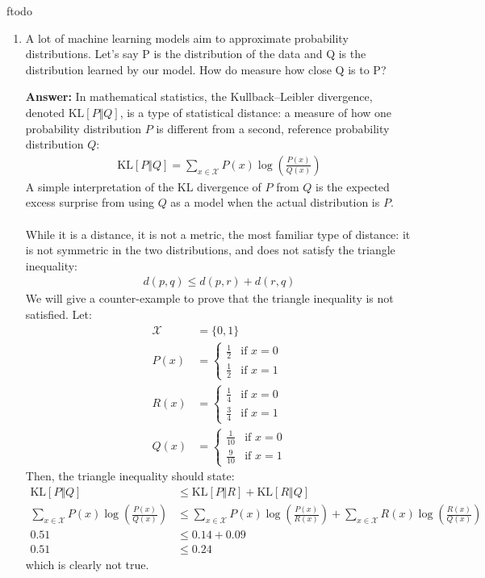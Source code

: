 ƒtodo\documentclass{article}
\newenvironment{QandA}{\begin{enumerate}[label=\arabic*.]}{\end{enumerate}}
\newenvironment{answer}{\par\normalfont \textbf{Answer:}}{}
\newcommand{\KL}[2]{\text{KL}\left[#1 \Vert #2 \right]}
\begin{document}
\begin{QandA}
    \item A lot of machine learning models aim to approximate probability distributions. Let’s say P is the distribution of the data and Q is the distribution learned by our model. How do measure how close Q is to P?
    \begin{answer}
        In mathematical statistics, the Kullback–Leibler divergence, denoted $\KL{P}{Q}$, is a type of statistical distance: a measure of how one probability distribution $P$ is different from a second, reference probability distribution $Q$:
        \begin{align*}
            \KL{P}{Q} = \sum_{x \in \mathcal{X}} P(x) \log \left( \frac{P(x)}{Q(x)} \right)
        \end{align*}
        A simple interpretation of the KL divergence of $P$ from $Q$ is the expected excess surprise from using $Q$ as a model when the actual distribution is $P$. \\\\
        While it is a distance, it is not a metric, the most familiar type of distance: it is not symmetric in the two distributions, and does not satisfy the triangle inequality:
        \begin{align*}
            d(p, q) \le d(p, r) + d(r, q)
        \end{align*}
        We will give a counter-example to prove that the triangle inequality is not satisfied. Let:
        \begin{align*}
            \mathcal{X} &= \{0, 1\} \\
            P(x) &= \begin{cases}
                \frac{1}{2} & \text{if } x = 0 \\
                \frac{1}{2} & \text{if } x = 1
            \end{cases} \\
            R(x) &= \begin{cases}
                \frac{1}{4} & \text{if } x = 0 \\
                \frac{3}{4} & \text{if } x = 1
            \end{cases} \\
            Q(x) &= \begin{cases}
                \frac{1}{10} & \text{if } x = 0 \\
                \frac{9}{10} & \text{if } x = 1
            \end{cases}        
        \end{align*}
        Then, the triangle inequality should state:
        \begin{align*}
            \KL{P}{Q} &\le \KL{P}{R} + \KL{R}{Q} \\
            \sum_{x \in \mathcal{X}} P(x) \log \left( \frac{P(x)}{Q(x)} \right) &\le \sum_{x \in \mathcal{X}} P(x) \log \left( \frac{P(x)}{R(x)} \right) + \sum_{x \in \mathcal{X}} R(x) \log \left( \frac{R(x)}{Q(x)} \right) \\
            0.51 &\le 0.14 + 0.09 \\
            0.51 &\le 0.24
        \end{align*}
        which is clearly not true.


\end{answer}
\end{QandA}
\end{document}
